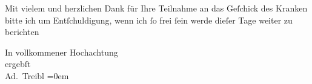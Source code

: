 \pstart
           Mit vielem und herzlichen Dank für Ihre Teilnahme an das Geſchick des Kranken bitte ich um
               Entſchuldigung, wenn ich{ }ſo frei{ }ſein werde dieſer Tage weiter zu berichten\pend
           
\pstart
           In vollkommener Hochachtung{\\[\baselineskip]}ergebſt{\\[\baselineskip]}\spacefill\mbox{Ad. Treibl}\pend
           \leftskip=0em{}\endnumbering{}  \newcommand{\dateiname}{L01575}\newcommand{\titel}{Adolf Treibl an Arthur Schnitzler, [22.? 1. 1906]}\newcommand{\editorInnen}{Martin Anton Müller und Gerd-Hermann Susen}
